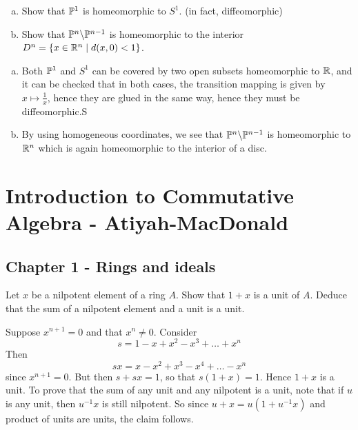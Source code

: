 \documentclass[11pt, english]{article}
\begin{document}
\begin{exc}[Exercise 15]
  \begin{enumerate}[a)]
  \item   Show that $\mathbb{P}^1$ is homeomorphic to $S^1$. (in fact, diffeomorphic)
\item Show that $\mathbb{P}^n \backslash \mathbb{P}^{n-1}$ is homeomorphic to the interior $D^n=\{ x \in \mathbb{R}^n \mid d(x,0) < 1 \}$.
  \end{enumerate}
\end{exc}
\begin{sol}
  \begin{enumerate}[a)]
  \item Both $\mathbb{P}^1$ and $S^1$ can be covered by two open subsets homeomorphic to $\mathbb{R}$, and it can be checked that in both cases, the transition mapping is given by $x \mapsto \frac 1x$, hence they are glued in the same way, hence they must be diffeomorphic.S
\item By using homogeneous coordinates, we see that $\mathbb{P}^n \backslash \mathbb{P}^{n-1}$ is homeomorphic to $\mathbb{R}^n$ which is again homeomorphic to the interior of a disc.
  \end{enumerate}
\end{sol}



\section{Introduction to Commutative Algebra - Atiyah-MacDonald}

\subsection{Chapter 1 - Rings and ideals}

\begin{exc}
Let $x$ be a nilpotent element of a ring $A$. Show that $1+x$ is a unit of $A$. Deduce that the sum of a nilpotent element and a unit is a unit.
\end{exc}
\begin{sol}
Suppose $x^{n+1}=0$ and that $x^n \neq 0$. Consider
\[
s = 1-x+x^2-x^3+\ldots+x^n
\]
Then
\[
sx = x-x^2+x^3-x^4+\ldots-x^n
\]
since $x^{n+1}=0$. But then $s+sx=1$, so that $s(1+x)=1$. Hence $1+x$ is a unit. To prove that the sum of any unit and any nilpotent is a unit, note that if $u$ is any unit, then $u^{-1}x$ is still nilpotent. So since $u+x=u(1+u^{-1}x)$ and product of units are units, the claim follows.
\end{sol}
\end{document}
